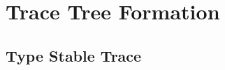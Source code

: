 \documentclass[mathserif,10pt]{beamer}
\begin{document}
\section{Trace Tree Formation}
\subsection{Type Stable Trace}
\frame
{
  \frametitle{\subsecname}
  \begin{figure}[h]
  \centering
  \end{figure}
}
\frame
{
  \frametitle{\subsecname}
  \begin{figure}[h]
  \centering
  \end{figure}
}
\end{document}
